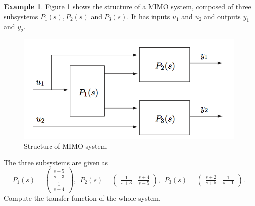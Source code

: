\documentclass[a4paper,12 pt]{article}
\numberwithin{equation}{section}
\theoremstyle{definition}
\newtheorem{bsp}{Example}
\theoremstyle{remark}
\theoremstyle{definition}
\theoremstyle{definition}
\theoremstyle{definition}
\theoremstyle{remark}
\begin{document}
\newpage
\begin{bsp}
Figure \ref{fig:rgatransf} shows the structure of a MIMO system, composed of three subsystems $P_1(s),P_2(s)$ and $P_3(s)$. It has inputs $u_1$ and $u_2$ and outputs $y_1$ and $y_2$.
\begin{figure}[ht]
\begin{center}
\includegraphics[width=0.65\columnwidth]{rgatransf}
\caption{Structure of MIMO system.}
\label{fig:rgatransf}
\end{center}
\end{figure}
The three subsystems are given as
\begin{equation*}
P_1(s)=\begin{pmatrix}
\frac{s-5}{s+3}\\[6pt]
\frac{1}{s+4}
\end{pmatrix}, \ \ P_2(s)=\begin{pmatrix}
\frac{1}{s+3}&\frac{s+4}{s-5}
\end{pmatrix}, \ \ P_3(s)=\begin{pmatrix} \frac{s+2}{s+5}&\frac{1}{s+1} \end{pmatrix}.
\end{equation*}
Compute the transfer function of the whole system.


\end{bsp}
\end{document}
